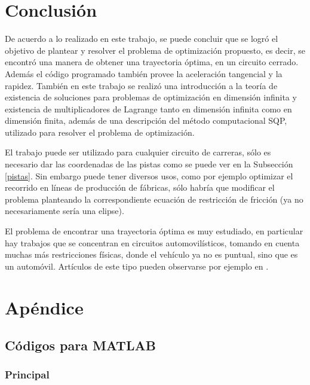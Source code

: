 \documentclass[a4paper,10pt]{book}
\newcounter{ejem}[section]
\begin{document}
\chapter{Conclusión}

De acuerdo a lo realizado en este trabajo, se puede concluir que se logró el objetivo de plantear y resolver el problema de optimización propuesto, es decir, se encontró una manera de obtener una trayectoria óptima, en un circuito cerrado. Además el código programado también provee la aceleración tangencial y la rapidez. También en este trabajo se realizó una introducción a la teoría de existencia de soluciones para problemas de optimización en dimensión infinita y existencia de multiplicadores de Lagrange tanto en dimensión infinita como en dimensión finita, además de una descripción del método computacional SQP, utilizado para resolver el problema de optimización.

El trabajo puede ser utilizado para cualquier circuito de carreras, sólo es necesario dar las coordenadas de las pistas como se puede ver en la Subsección \ref{pistas}. Sin embargo puede tener diversos usos, como por ejemplo optimizar el recorrido en líneas de producción de fábricas, sólo habría que modificar el problema planteando la correspondiente ecuación de restricción de fricción (ya no necesariamente sería una elipse).

El problema de encontrar una trayectoria óptima es muy estudiado, en particular hay trabajos que se concentran en circuitos automovilísticos, tomando en cuenta muchas más restricciones físicas, donde el vehículo ya no es puntual, sino que es un automóvil. Artículos de este tipo pueden observarse por ejemplo en \cite{xiong2010racing,van2015optimal,romeromecanica}. 







\chapter{Apéndice}


\section{Códigos para MATLAB}

\subsection{Principal}\label{main}

\end{document}
